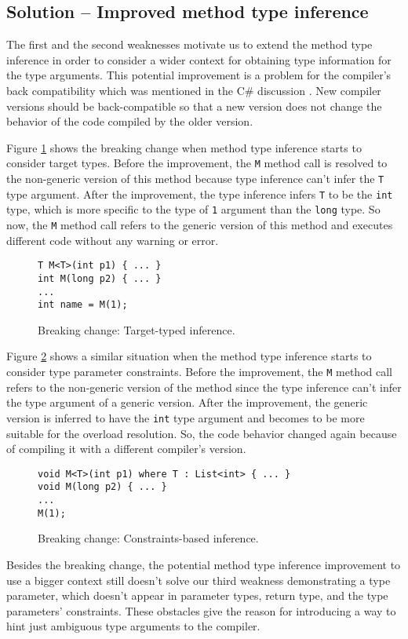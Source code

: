 \subsection{Solution -- Improved method type inference}

The first and the second weaknesses motivate us to extend the method type inference in order to consider a wider context for obtaining type information for the type arguments. 
This potential improvement is a problem for the compiler's back compatibility which was mentioned in the C\# discussion \cite{online:breakingChange}. 
New compiler versions should be back-compatible so that a new version does not change the behavior of the code compiled by the older version.
\par
Figure \ref{img30:breakingChange1} shows the breaking change when method type inference starts to consider target types. 
Before the improvement, the \texttt{M} method call is resolved to the non-generic version of this method because type inference can’t infer the \texttt{T} type argument. 
After the improvement, the type inference infers \texttt{T} to be the \texttt{int} type, which is more specific to the type of \texttt{1} argument than the \texttt{long} type. 
So now, the \texttt{M} method call refers to the generic version of this method and executes different code without any warning or error.
\begin{figure}[h]
\begin{lstlisting}[style=csharp]
T M<T>(int p1) { ... }
int M(long p2) { ... }
...
int name = M(1);
\end{lstlisting}
\caption{Breaking change: Target-typed inference.}
\label{img30:breakingChange1}
\end{figure}
\par
Figure \ref{img31:breakingChange2} shows a similar situation when the method type inference starts to consider type parameter constraints. 
Before the improvement, the \texttt{M} method call refers to the non-generic version of the method since the type inference can’t infer the type argument of a generic version. 
After the improvement, the generic version is inferred to have the \texttt{int} type argument and becomes to be more suitable for the overload resolution. 
So, the code behavior changed again because of compiling it with a different compiler's version.
\begin{figure}[h]
\begin{lstlisting}[style=csharp]
void M<T>(int p1) where T : List<int> { ... }
void M(long p2) { ... }
...
M(1);
\end{lstlisting}
\caption{Breaking change: Constraints-based inference.}
\label{img31:breakingChange2}
\end{figure}
\par
Besides the breaking change, the potential method type inference improvement to use a bigger context still doesn’t solve our third weakness demonstrating a type parameter, which doesn’t appear in parameter types, return type, and the type parameters’ constraints. 
These obstacles give the reason for introducing a way to hint just ambiguous type arguments to the compiler.

